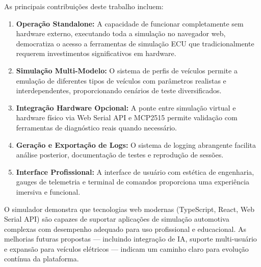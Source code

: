 As principais contribuições deste trabalho incluem:

\begin{enumerate}
    \item \textbf{Operação Standalone:} A capacidade de funcionar completamente sem hardware externo, executando toda a simulação no navegador web, democratiza o acesso a ferramentas de simulação ECU que tradicionalmente requerem investimentos significativos em hardware.
    
    \item \textbf{Simulação Multi-Modelo:} O sistema de perfis de veículos permite a emulação de diferentes tipos de veículos com parâmetros realistas e interdependentes, proporcionando cenários de teste diversificados.
    
    \item \textbf{Integração Hardware Opcional:} A ponte entre simulação virtual e hardware físico via Web Serial API e MCP2515 permite validação com ferramentas de diagnóstico reais quando necessário.
    
    \item \textbf{Geração e Exportação de Logs:} O sistema de logging abrangente facilita análise posterior, documentação de testes e reprodução de sessões.
    
    \item \textbf{Interface Profissional:} A interface de usuário com estética de engenharia, gauges de telemetria e terminal de comandos proporciona uma experiência imersiva e funcional.
\end{enumerate}

O simulador demonstra que tecnologias web modernas (TypeScript, React, Web Serial API) são capazes de suportar aplicações de simulação automotiva complexas com desempenho adequado para uso profissional e educacional. As melhorias futuras propostas --- incluindo integração de IA, suporte multi-usuário e expansão para veículos elétricos --- indicam um caminho claro para evolução contínua da plataforma.

